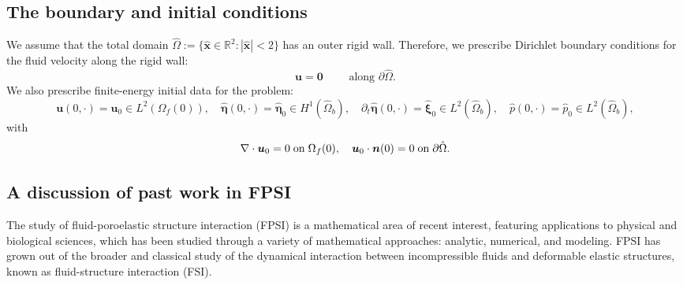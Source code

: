 \documentclass[11pt]{article}
\newcommand{\bd}{\boldsymbol}
\def\R{{\mathbb R}}
\theoremstyle{definition}
\begin{document}
\subsection{The boundary and initial conditions}

We assume that the total domain $\hat{\Omega} := \{\hat{\bd{x}} \in \R^{2} : |\hat{\bd{x}}| < 2\}$ has an outer rigid wall. Therefore, we prescribe Dirichlet boundary conditions for the fluid velocity along the rigid wall:
\begin{equation}\label{boundaryconditions}
\bd{u} = \bd{0} \qquad \text{ along } \partial\hat{\Omega}.
\end{equation}
We also prescribe finite-energy initial data for the problem:
\begin{equation*}
\bd{u}(0, \cdot) = \bd{u}_{0} \in L^{2}(\Omega_{f}(0)), \quad \hat{\bd{\eta}}(0, \cdot) = \hat{\bd{\eta}}_{0} \in H^{1}(\hat{\Omega}_{b}), \quad \partial_t\hat{\bd{\eta}}(0, \cdot)=\hat{\bd{\xi}}_{0} \in L^2(\hat{\Omega}_{b}),  \quad \hat{p}(0, \cdot) = \hat{p}_0 \in L^{2}(\hat{\Omega}_{b}),
\end{equation*}
with 
\begin{equation}\label{U0CC}
\nabla \cdot \bd{u}_{0} = 0\; {\rm on}\; \Omega_{f}(0),
\quad \bd{u}_0\cdot\bd{n}(0) = 0\; {\rm on}\; \partial\hat{\Omega}.
\end{equation}

\subsection{A discussion of past work in FPSI}

The study of fluid-poroelastic structure interaction (FPSI) is a mathematical area of recent interest, featuring applications to physical and biological sciences, which has been studied through a variety of mathematical approaches: analytic, numerical, and modeling. FPSI has grown out of the broader and classical study of the dynamical interaction between incompressible fluids and deformable elastic structures, known as fluid-structure interaction (FSI). 
\end{document}
